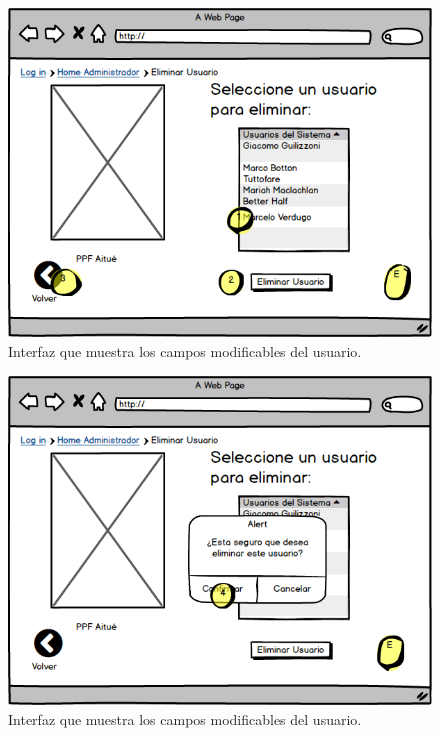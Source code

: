 \clearpage

\begin{figure}[h!]
	\label{elimuser2}
	\begin{center}
		\includegraphics[scale=0.3]{imagenes/elimuser2.png}
	\end{center}
	\caption{Interfaz que muestra los campos modificables del usuario.}
\end{figure}

\begin{figure}[h!]
	\label{elimuser4}
	\begin{center}
		\includegraphics[scale=0.3]{imagenes/elimuser4.png}
	\end{center}
	\caption{Interfaz que muestra los campos modificables del usuario.}
\end{figure}

